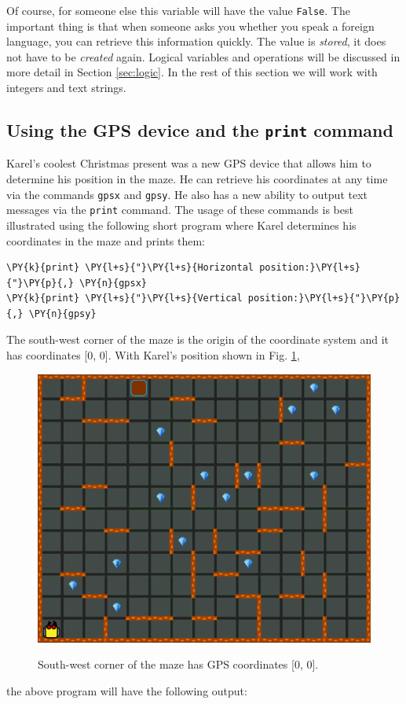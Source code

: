 \noindent
Of course, for someone else this variable will have the value {\tt False}. The important 
thing is that when someone asks you whether you speak a foreign language, you can retrieve 
this information quickly. The value is {\em stored}, it does not have to be {\em created}
again. Logical variables and operations will be discussed in more detail in Section 
\ref{sec:logic}. In the rest of this section we will work with integers and text strings.

\subsection[\ \ Using the GPS device and the {\tt print} command]{Using the GPS device and the {\tt print} command}

Karel's coolest Christmas present was a new GPS device that allows him to determine his position 
in the maze. He can retrieve his coordinates at any time via the 
commands {\tt gpsx} and {\tt gpsy}. He also has a new ability to output text messages via the {\tt print} 
command. The usage of these commands is best illustrated using the following short program where 
Karel determines his coordinates in the maze and prints them:\\

\begin{bbox}
\begin{Verbatim}[commandchars=\\\{\}]
\PY{k}{print} \PY{l+s}{"}\PY{l+s}{Horizontal position:}\PY{l+s}{"}\PY{p}{,} \PY{n}{gpsx}
\PY{k}{print} \PY{l+s}{"}\PY{l+s}{Vertical position:}\PY{l+s}{"}\PY{p}{,} \PY{n}{gpsy}
\end{Verbatim}
\end{bbox}
\vspace{6mm}

\noindent
The south-west corner of the maze is the origin of the coordinate system and it has 
coordinates [0, 0]. With Karel's position shown in Fig. \ref{fig:gps-100},

\begin{figure}[!ht]
\begin{center}
\includegraphics[height=0.4\textwidth]{img/gps-100.png}
\vspace{-0mm}
\caption{South-west corner of the maze has GPS coordinates [0, 0].}
\vspace{-6mm}
\label{fig:gps-100}
\end{center}
\end{figure}
\noindent
the above program will have the following output:\\

